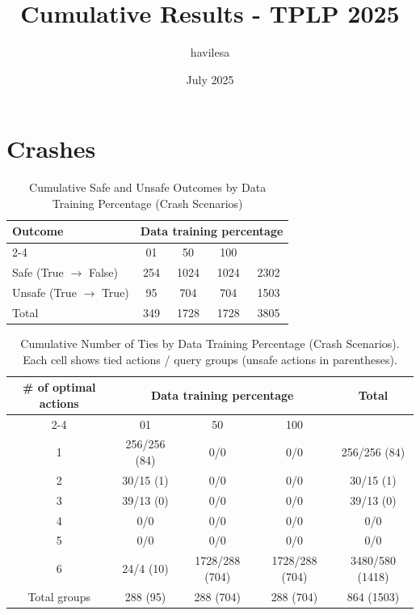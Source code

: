 \documentclass{article}
\title{Cumulative Results - TPLP 2025}
\author{havilesa}
\date{July 2025}
\begin{document}
\maketitle

\section{Crashes}
\begin{table}[h]
\centering
\caption{Cumulative Safe and Unsafe Outcomes by Data Training Percentage (Crash Scenarios)}
\begin{tabular}{l|ccc|c}
\toprule
\multirow{2}{*}{Outcome} & \multicolumn{5}{c|}{Data training percentage} & \multirow{2}{*}{Total} \\
\cmidrule{2-4}
 & 01 & 50 & 100 & \\
\midrule
Safe (True $\rightarrow$ False) & 254 & 1024 & 1024 & 2302 \\ 
Unsafe (True $\rightarrow$ True) & 95 & 704 & 704 & 1503 \\ 
\midrule
Total & 349 & 1728 & 1728 & 3805 \\ 
\bottomrule
\end{tabular}
\end{table}

\begin{table}[h]
\centering
\caption{Cumulative Number of Ties by Data Training Percentage (Crash Scenarios).
Each cell shows tied actions / query groups (unsafe actions in parentheses).}
\begin{tabular}{c|ccc|c}
\toprule
\multirow{2}{*}{\# of optimal actions} & \multicolumn{3}{c|}{Data training percentage} & \multirow{2}{*}{Total} \\
\cmidrule{2-4}
 & 01 & 50 & 100 & \\
\midrule
1 & 256/256 (84) & 0/0 & 0/0 & 256/256 (84) \\ 
2 & 30/15 (1) & 0/0 & 0/0 & 30/15 (1) \\ 
3 & 39/13 (0) & 0/0 & 0/0 & 39/13 (0) \\ 
4 & 0/0 & 0/0 & 0/0 & 0/0 \\ 
5 & 0/0 & 0/0 & 0/0 & 0/0 \\ 
6 & 24/4 (10) & 1728/288 (704) & 1728/288 (704) & 3480/580 (1418) \\ 
\midrule
Total groups & 288 (95) & 288 (704) & 288 (704) & 864 (1503) \\ 
\bottomrule
\end{tabular}
\end{table}
\end{document}
